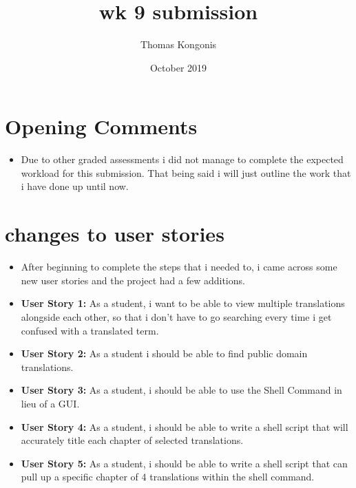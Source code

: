 \documentclass{article}
\title{wk 9 submission}
\author{Thomas Kongonis}
\date{October 2019}
\begin{document}
\maketitle

\section{Opening Comments}
\begin{itemize}
\item{Due to other graded assessments i did not manage to complete the expected workload for this submission. That being said i will just outline the work that i have done up until now.}
\end{itemize}

\section{changes to user stories}

\begin{itemize}
    \item{After beginning to complete the steps that i needed to, i came across some new user stories and the project had a few additions.}
    
    \item{\textbf{User Story 1:} As a student, i want to be able to view multiple  translations alongside each other, so that i don’t have to go searching every time i get confused with a translated term.}
    \item{\textbf{User Story 2:} As a student i should be able to find public domain translations.}
    \item{\textbf{User Story 3:} As a student, i should be able to use the Shell Command in lieu of a GUI.}
    \item{\textbf{User Story 4:} As a student, i should be able to write a shell script that will accurately title each chapter of selected translations.}
    \item{\textbf{User Story 5:} As a student, i should be able to write a shell script that can pull up a specific chapter of 4 translations within the shell command.}
    
\end{itemize}
\end{document}
